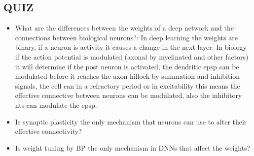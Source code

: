 \documentclass[main]{subfiles}
\begin{document}
\subsection{QUIZ}
\begin{itemize}
    \item What are the differences between the weights of a deep network and the connections between biological neurons?: 
    In deep learning the weights are binary, if a neuron is activity it causes a change in the next layer.
    In biology if the action potential is modulated (axonal by myelinated and other factors) it will determine if the post neuron is activated, the dendritic epsp can be modulated before it reaches the axon hillock by summation and inhibition signals, the cell can in a refractory period or in excitability this means the effective connective between neurons can be modulated, also the inhibitory nts can modulate the epsp.
    \item Is synaptic plasticity the only mechanism that neurons can use to alter their effective connectivity?
    \item Is weight tuning by BP the only mechanism in DNNs that affect the weights?
\end{itemize}
\end{document}
